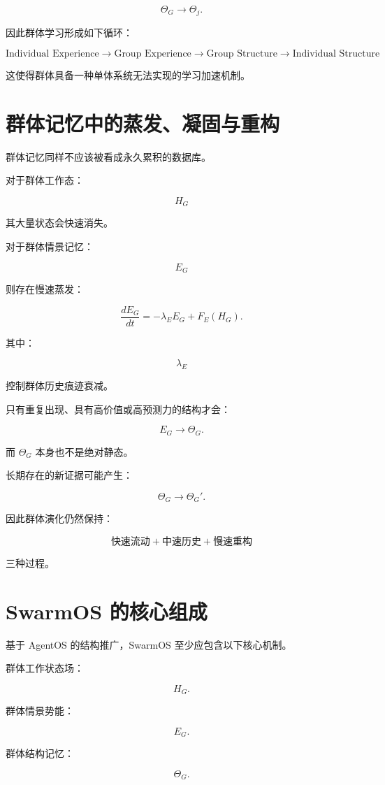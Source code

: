 \[
\Theta_G
\rightarrow
\Theta_j.
\]

因此群体学习形成如下循环：

\[
\boxed{
\text{Individual Experience}
\rightarrow
\text{Group Experience}
\rightarrow
\text{Group Structure}
\rightarrow
\text{Individual Structure}
}
\]

这使得群体具备一种单体系统无法实现的学习加速机制。


\section{群体记忆中的蒸发、凝固与重构}

群体记忆同样不应该被看成永久累积的数据库。

对于群体工作态：

\[
H_G
\]

其大量状态会快速消失。

对于群体情景记忆：

\[
E_G
\]

则存在慢速蒸发：

\[
\frac{dE_G}{dt}
=
-\lambda_EE_G
+
F_E(H_G).
\]

其中：

\[
\lambda_E
\]

控制群体历史痕迹衰减。

只有重复出现、具有高价值或高预测力的结构才会：

\[
E_G
\rightarrow
\Theta_G.
\]

而 $\Theta_G$ 本身也不是绝对静态。

长期存在的新证据可能产生：

\[
\Theta_G
\rightarrow
\Theta_G'.
\]

因此群体演化仍然保持：

\[
\boxed{
\text{快速流动}
+
\text{中速历史}
+
\text{慢速重构}
}
\]

三种过程。


\section{SwarmOS 的核心组成}

基于 AgentOS 的结构推广，SwarmOS 至少应包含以下核心机制。

群体工作状态场：

\[
H_G.
\]

群体情景势能：

\[
E_G.
\]

群体结构记忆：

\[
\Theta_G.
\]

